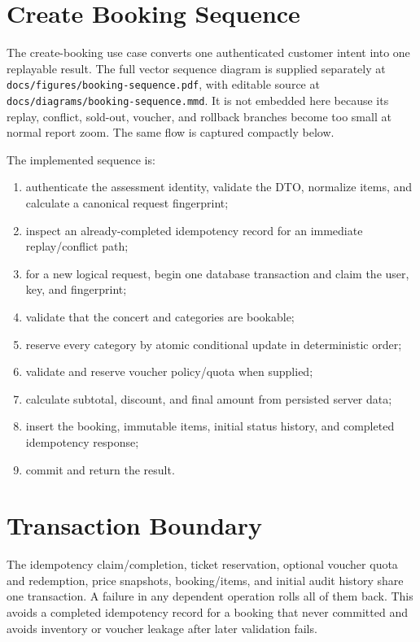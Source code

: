 \section{Create Booking Sequence}
The create-booking use case converts one authenticated customer intent into one
replayable result. The full vector sequence diagram is supplied separately at
\nolinkurl{docs/figures/booking-sequence.pdf}, with editable source at
\nolinkurl{docs/diagrams/booking-sequence.mmd}. It is not embedded here because
its replay, conflict, sold-out, voucher, and rollback branches become too small
at normal report zoom. The same flow is captured compactly below.

The implemented sequence is:
\begin{enumerate}
  \item authenticate the assessment identity, validate the DTO, normalize items, and calculate a canonical request fingerprint;
  \item inspect an already-completed idempotency record for an immediate replay/conflict path;
  \item for a new logical request, begin one database transaction and claim the user, key, and fingerprint;
  \item validate that the concert and categories are bookable;
  \item reserve every category by atomic conditional update in deterministic order;
  \item validate and reserve voucher policy/quota when supplied;
  \item calculate subtotal, discount, and final amount from persisted server data;
  \item insert the booking, immutable items, initial status history, and completed idempotency response;
  \item commit and return the result.
\end{enumerate}

\section{Transaction Boundary}
The idempotency claim/completion, ticket reservation, optional voucher quota and
redemption, price snapshots, booking/items, and initial audit history share one
transaction. A failure in any dependent operation rolls all of them back. This
avoids a completed idempotency record for a booking that never committed and
avoids inventory or voucher leakage after later validation fails.

